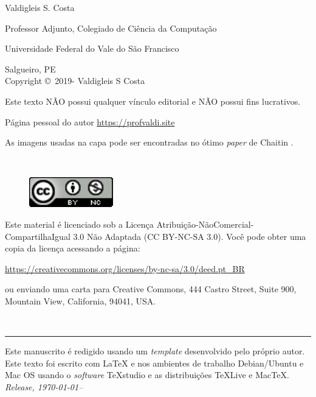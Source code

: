 \newpage
\noindent Valdigleis S. Costa

\noindent Professor Adjunto, Colegiado de Ciência da Computação

\noindent Universidade Federal do Vale do São Francisco

\noindent Salgueiro, PE\\

\noindent Copyright \copyright\ 2019-{\the\year} Valdigleis S Costa

\noindent Este texto  \textsc{NÃO}  possui qualquer vínculo editorial e \textsc{NÃO} possui fins lucrativos.

\noindent Página pessoal do autor \url{https://profvaldi.site}

\noindent As imagens usadas na capa pode ser encontradas no ótimo \textit{paper} de Chaitin \cite{chaitin2002figures}.

~\vfill

\thispagestyle{empty}


\begin{figure}[h]
	\centering
	\includegraphics[width=0.15\linewidth]{figures/license}
\end{figure}
\noindent Este material é licenciado sob a Licença Atribuição-NãoComercial-CompartilhaIgual 3.0 Não Adaptada (CC BY-NC-SA 3.0).  Você pode obter uma copia da licença acessando a página: 
\begin{center}
	\url{https://creativecommons.org/licenses/by-nc-sa/3.0/deed.pt_BR}
\end{center}
\noindent ou enviando uma carta para Creative Commons, 444 Castro Street, Suite 900, Mountain View, California, 94041, USA.

~\vfill

\thispagestyle{empty}

\hrule
\vspace*{1cm}

\noindent Este manuscrito é redigido usando um \textit{template} desenvolvido pelo próprio autor. Este texto foi escrito com {\LaTeX} e {\LaTeXe} nos ambientes de trabalho Debian/Ubuntu e Mac OS usando o \textit{software} TeXstudio e as distribuições  {\TeX}Live e Mac{\TeX}. \\ 

\noindent \textit{Release, \today--\currenttime} %
\newpage